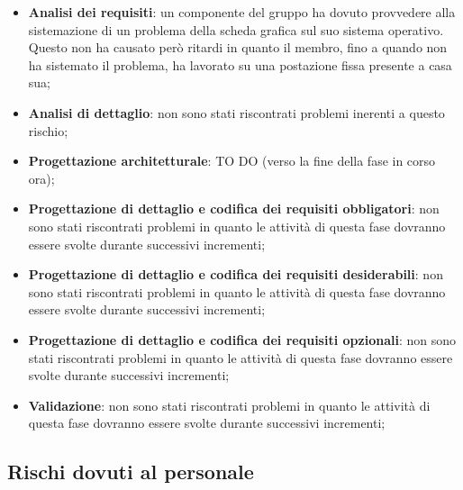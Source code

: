 			\begin{itemize}
				\item \textbf{Analisi dei requisiti}: un componente del gruppo ha dovuto provvedere alla sistemazione di un problema della scheda grafica sul suo sistema operativo. \newline
				Questo non ha causato però ritardi in quanto il membro, fino a quando non ha sistemato il problema, ha lavorato su una postazione fissa presente a casa sua;
				\item \textbf{Analisi di dettaglio}: non sono stati riscontrati problemi inerenti a questo rischio;
				\item \textbf{Progettazione architetturale}: TO DO (verso la fine della fase in corso ora);
				\item \textbf{Progettazione di dettaglio e codifica dei requisiti obbligatori}: non sono stati riscontrati problemi in quanto le attività di questa fase dovranno essere svolte durante successivi incrementi;
				\item \textbf{Progettazione di dettaglio e codifica dei requisiti desiderabili}: non sono stati riscontrati problemi in quanto le attività di questa fase dovranno essere svolte durante successivi incrementi;
				\item \textbf{Progettazione di dettaglio e codifica dei requisiti opzionali}: non sono stati riscontrati problemi in quanto le attività di questa fase dovranno essere svolte durante successivi incrementi;
				\item \textbf{Validazione}: non sono stati riscontrati problemi in quanto le attività di questa fase dovranno essere svolte durante successivi incrementi;
			\end{itemize}


	
	\subsection{Rischi dovuti al personale} %
	\label{sub:rischi_dovuti_al_personale}
